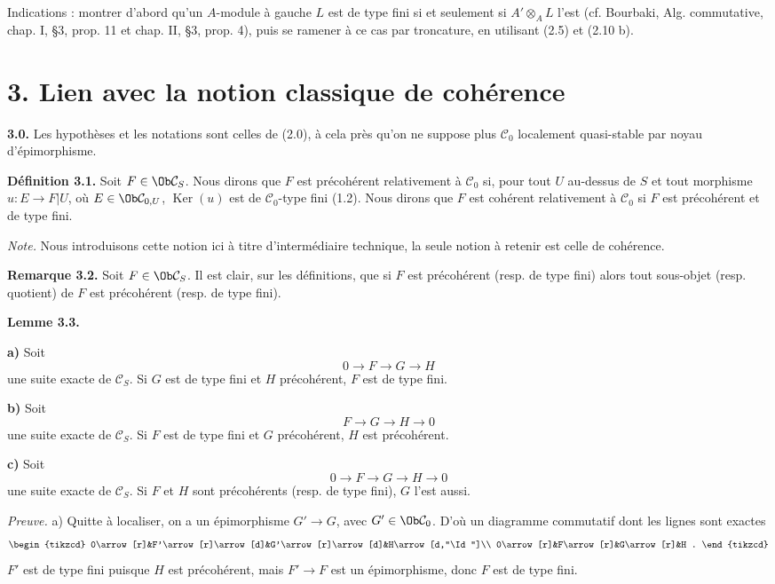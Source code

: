 \documentclass[11pt]{article}
\providecommand{\Ker}{\operatorname{Ker}}
\begin{document}
Indications : montrer d'abord qu'un \(A\)-module à gauche \(L\) est de type fini si et seulement si \(A'\otimes_A L\) l'est (cf. Bourbaki, Alg. commutative, chap. I, §3, prop. 11 et chap. II, §3, prop. 4), puis se ramener à ce cas par troncature, en utilisant (2.5) et (2.10 b).

\section*{3. Lien avec la notion classique de cohérence}

\textbf{3.0.} Les hypothèses et les notations sont celles de (2.0), à cela près qu'on ne suppose plus \(\mathcal C_0\) localement quasi-stable par noyau d'épimorphisme.

\textbf{Définition 3.1.} Soit \(F\in\Ob\mathcal C_S\). Nous dirons que \(F\) est précohérent relativement à \(\mathcal C_0\) si, pour tout \(U\) au-dessus de \(S\) et tout morphisme \(u:E\to F|U\), où \(E\in\Ob\mathcal C_{0,U}\), \(\Ker(u)\) est de \(\mathcal C_0\)-type fini (1.2). Nous dirons que \(F\) est cohérent relativement à \(\mathcal C_0\) si \(F\) est précohérent et de type fini.

\emph{Note.} Nous introduisons cette notion ici à titre d'intermédiaire technique, la seule notion à retenir est celle de cohérence.

\textbf{Remarque 3.2.} Soit \(F\in\Ob\mathcal C_S\). Il est clair, sur les définitions, que si \(F\) est précohérent (resp. de type fini) alors tout sous-objet (resp. quotient) de \(F\) est précohérent (resp. de type fini).

\textbf{Lemme 3.3.}

\textbf{a)} Soit
\[
  0\longrightarrow F\longrightarrow G\longrightarrow H
\]
une suite exacte de \(\mathcal C_S\). Si \(G\) est de type fini et \(H\) précohérent, \(F\) est de type fini.

\textbf{b)} Soit
\[
  F\longrightarrow G\longrightarrow H\longrightarrow 0
\]
une suite exacte de \(\mathcal C_S\). Si \(F\) est de type fini et \(G\) précohérent, \(H\) est précohérent.

\textbf{c)} Soit
\[
  0\longrightarrow F\longrightarrow G\longrightarrow H\longrightarrow 0
\]
une suite exacte de \(\mathcal C_S\). Si \(F\) et \(H\) sont précohérents (resp. de type fini), \(G\) l'est aussi.

\emph{Preuve.} a) Quitte à localiser, on a un épimorphisme \(G'\to G\), avec \(G'\in\Ob\mathcal C_0\). D'où un diagramme commutatif dont les lignes sont exactes
\[
\begin{tikzcd}
0\arrow[r]&F'\arrow[r]\arrow[d]&G'\arrow[r]\arrow[d]&H\arrow[d,"\Id"]\\
0\arrow[r]&F\arrow[r]&G\arrow[r]&H .
\end{tikzcd}
\]
\(F'\) est de type fini puisque \(H\) est précohérent, mais \(F'\to F\) est un épimorphisme, donc \(F\) est de type fini.
\end{document}

